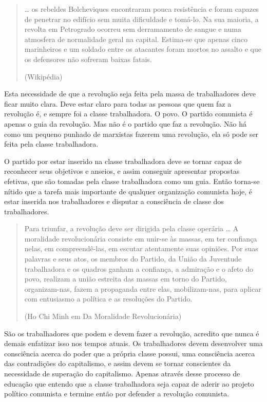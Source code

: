 \begin{quote}
… os rebeldes Bolcheviques encontraram pouca resistência e foram capazes de penetrar no edifício sem muita dificuldade e tomá-lo. Na sua maioria, a revolta em Petrogrado ocorreu sem derramamento de sangue e numa atmosfera de normalidade geral na capital. Estima-se que apenas cinco marinheiros e um soldado entre os atacantes foram mortos no assalto e que os defensores não sofreram baixas fatais.

(Wikipédia)
\end{quote}

Esta necessidade de que a revolução seja feita pela massa de trabalhadores deve ficar muito clara. Deve estar claro para todas as pessoas que quem faz a revolução é, e sempre foi a classe trabalhadora. O povo. O partido comunista é apenas o guia da revolução. Mas não é o partido que faz a revolução. Não há como um pequeno punhado de marxistas fazerem uma revolução, ela só pode ser feita pela classe trabalhadora. 

O partido por estar inserido na classe trabalhadora deve se tornar capaz de reconhecer seus objetivos e anseios, e assim conseguir apresentar propostas efetivas, que são tomadas pela classe trabalhadora como um guia. Então torna-se nítido que a tarefa mais importante de qualquer organização comunista hoje, é estar inserida nos trabalhadores e disputar a consciência de classe dos trabalhadores.

\begin{quote}
Para triunfar, a revolução deve ser dirigida pela classe operária … A moralidade revolucionária consiste em unir-se às massas, em ter confiança nelas, em compreendê-las, em escutar atentamente suas opiniões. Por suas palavras e seus atos, os membros do Partido, da União da Juventude trabalhadora e os quadros ganham a confiança, a admiração e o afeto do povo, realizam a união estreita das massas em torno do Partido, organizam-nas, fazem a propaganda entre elas, mobilizam-nas, para aplicar com entusiasmo a política e as resoluções do Partido.

(Ho Chi Minh em Da Moralidade Revolucionária)
\end{quote}

São os trabalhadores que podem e devem fazer a revolução, acredito que nunca é demais enfatizar isso nos tempos atuais. Os trabalhadores devem desenvolver uma consciência acerca do poder que a própria classe possui, uma consciência acerca das contradições do capitalismo, e assim devem se tornar conscientes da necessidade de superação do capitalismo. Apenas através desse processo de educação que entendo que a classe trabalhadora seja capaz de aderir ao projeto político comunista e termine então por defender a revolução comunista.

